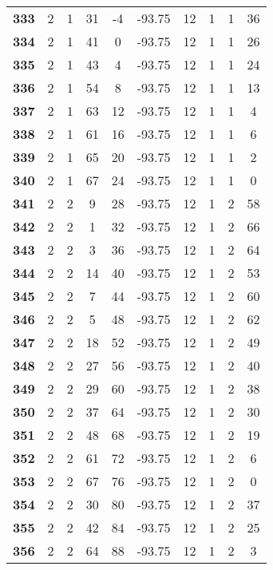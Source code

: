 \documentclass{article}%
\begin{document}
\begin{longtable}{cccccccccc}
        \textbf{333} & 2 & 1 & 31 & -4 & -93.75 & 12 & 1 & 1 & 36 \\ 
        \textbf{334} & 2 & 1 & 41 & 0 & -93.75 & 12 & 1 & 1 & 26 \\ 
        \textbf{335} & 2 & 1 & 43 & 4 & -93.75 & 12 & 1 & 1 & 24 \\ 
        \textbf{336} & 2 & 1 & 54 & 8 & -93.75 & 12 & 1 & 1 & 13 \\ 
        \textbf{337} & 2 & 1 & 63 & 12 & -93.75 & 12 & 1 & 1 & 4 \\ 
        \textbf{338} & 2 & 1 & 61 & 16 & -93.75 & 12 & 1 & 1 & 6 \\ 
        \textbf{339} & 2 & 1 & 65 & 20 & -93.75 & 12 & 1 & 1 & 2 \\ 
        \textbf{340} & 2 & 1 & 67 & 24 & -93.75 & 12 & 1 & 1 & 0 \\ 
        \textbf{341} & 2 & 2 & 9 & 28 & -93.75 & 12 & 1 & 2 & 58 \\ 
        \textbf{342} & 2 & 2 & 1 & 32 & -93.75 & 12 & 1 & 2 & 66 \\ 
        \textbf{343} & 2 & 2 & 3 & 36 & -93.75 & 12 & 1 & 2 & 64 \\ 
        \textbf{344} & 2 & 2 & 14 & 40 & -93.75 & 12 & 1 & 2 & 53 \\ 
        \textbf{345} & 2 & 2 & 7 & 44 & -93.75 & 12 & 1 & 2 & 60 \\ 
        \textbf{346} & 2 & 2 & 5 & 48 & -93.75 & 12 & 1 & 2 & 62 \\ 
        \textbf{347} & 2 & 2 & 18 & 52 & -93.75 & 12 & 1 & 2 & 49 \\ 
        \textbf{348} & 2 & 2 & 27 & 56 & -93.75 & 12 & 1 & 2 & 40 \\ 
        \textbf{349} & 2 & 2 & 29 & 60 & -93.75 & 12 & 1 & 2 & 38 \\ 
        \textbf{350} & 2 & 2 & 37 & 64 & -93.75 & 12 & 1 & 2 & 30 \\ 
        \textbf{351} & 2 & 2 & 48 & 68 & -93.75 & 12 & 1 & 2 & 19 \\ 
        \textbf{352} & 2 & 2 & 61 & 72 & -93.75 & 12 & 1 & 2 & 6 \\ 
        \textbf{353} & 2 & 2 & 67 & 76 & -93.75 & 12 & 1 & 2 & 0 \\ 
        \textbf{354} & 2 & 2 & 30 & 80 & -93.75 & 12 & 1 & 2 & 37 \\ 
        \textbf{355} & 2 & 2 & 42 & 84 & -93.75 & 12 & 1 & 2 & 25 \\ 
        \textbf{356} & 2 & 2 & 64 & 88 & -93.75 & 12 & 1 & 2 & 3 \\ 

\end{longtable}
\end{document}

